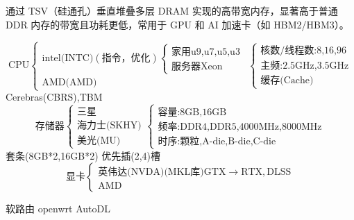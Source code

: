 \documentclass[12pt]{article}
\begin{document}
\begin{defn}
  通过 TSV（硅通孔）垂直堆叠多层 DRAM 实现的高带宽内存，显著高于普通 DDR 内存的带宽且功耗更低，常用于 GPU 和 AI 加速卡（如 HBM2/HBM3）。
\end{defn}
\begin{note}
  \[
    \text{CPU}\begin{cases}
      \text{intel(INTC)}(\text{指令，优化})\begin{cases}
                                        \text{家用}\text{u9,u7,u5,u3} \\
                                        \text{服务器}\text{Xeon}
                                      \end{cases} \\
      \text{AMD(AMD)}
    \end{cases}\begin{cases}
      \text{核数/线程数:8,16,96}   \\
      \text{主频:2.5GHz,3.5GHz} \\
      \text{缓存(Cache)}
    \end{cases}
  \]
  Cerebras(CBRS),TBM
  \[
    \text{存储器}\begin{cases}
      \text{三星}        \\
      \text{海力士(SKHY)} \\
      \text{美光(MU)}
    \end{cases}\begin{cases}
      \text{容量:8GB,16GB}                  \\
      \text{频率:DDR4,DDR5,4000MHz,8000MHz} \\
      \text{时序:颗粒,A-die,B-die,C-die}
    \end{cases}
  \]
  套条(8GB*2,16GB*2) 优先插(2,4)槽
  \[
    \text{显卡}\begin{cases}
      \text{英伟达(NVDA)(MKL库)}\text{GTX}\rightarrow\text{RTX},\text{DLSS} \\
      \text{AMD}
    \end{cases}
  \]
\end{note}
\begin{note}
  软路由 openwrt AutoDL
\end{note}
\end{document}
